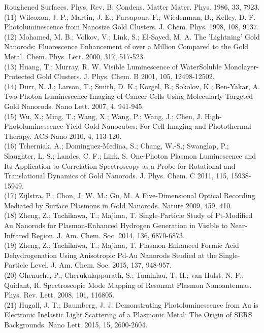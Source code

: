 \documentclass[10pt]{article}
\begin{document}
Roughened Surfaces. Phys. Rev. B: Condens. Matter Mater. Phys. 1986, 33, 7923.\\
(11) Wilcoxon, J. P.; Martin, J. E.; Parsapour, F.; Wiedenman, B.; Kelley, D. F. Photoluminescence from Nanosize Gold Clusters. J. Chem. Phys. 1998, 108, 9137.\\
(12) Mohamed, M. B.; Volkov, V.; Link, S.; El-Sayed, M. A. The 'Lightning' Gold Nanorods: Fluorescence Enhancement of over a Million Compared to the Gold Metal. Chem. Phys. Lett. 2000, 317, 517-523.\\
(13) Huang, T.; Murray, R. W. Visible Luminescence of WaterSoluble Monolayer-Protected Gold Clusters. J. Phys. Chem. B 2001, 105, 12498-12502.\\
(14) Durr, N. J.; Larson, T.; Smith, D. K.; Korgel, B.; Sokolov, K.; Ben-Yakar, A. Two-Photon Luminescence Imaging of Cancer Cells Using Molecularly Targeted Gold Nanorods. Nano Lett. 2007, 4, 941-945.\\
(15) Wu, X.; Ming, T.; Wang, X.; Wang, P.; Wang, J.; Chen, J. High-Photoluminescence-Yield Gold Nanocubes: For Cell Imaging and Photothermal Therapy. ACS Nano 2010, 4, 113-120.\\
(16) Tcherniak, A.; Dominguez-Medina, S.; Chang, W.-S.; Swanglap, P.; Slaughter, L. S.; Landes, C. F.; Link, S. One-Photon Plasmon Luminescence and Its Application to Correlation Spectroscopy as a Probe for Rotational and Translational Dynamics of Gold Nanorods. J. Phys. Chem. C 2011, 115, 15938-15949.\\
(17) Zijlstra, P.; Chon, J. W. M.; Gu, M. A Five-Dimensional Optical Recording Mediated by Surface Plasmons in Gold Nanorods. Nature 2009, 459, 410.\\
(18) Zheng, Z.; Tachikawa, T.; Majima, T. Single-Particle Study of Pt-Modified Au Nanorods for Plasmon-Enhanced Hydrogen Generation in Visible to Near-Infrared Region. J. Am. Chem. Soc. 2014, 136, 6870-6873.\\
(19) Zheng, Z.; Tachikawa, T.; Majima, T. Plasmon-Enhanced Formic Acid Dehydrogenation Using Anisotropic Pd-Au Nanorods Studied at the Single-Particle Level. J. Am. Chem. Soc. 2015, 137, 948-957.\\
(20) Ghenuche, P.; Cherukulappurath, S.; Taminiau, T. H.; van Hulst, N. F.; Quidant, R. Spectroscopic Mode Mapping of Resonant Plasmon Nanoantennas. Phys. Rev. Lett. 2008, 101, 116805.\\
(21) Hugall, J. T.; Baumberg, J. J. Demonstrating Photoluminescence from Au is Electronic Inelastic Light Scattering of a Plasmonic Metal: The Origin of SERS Backgrounds. Nano Lett. 2015, 15, 2600-2604.\\
\end{document}
